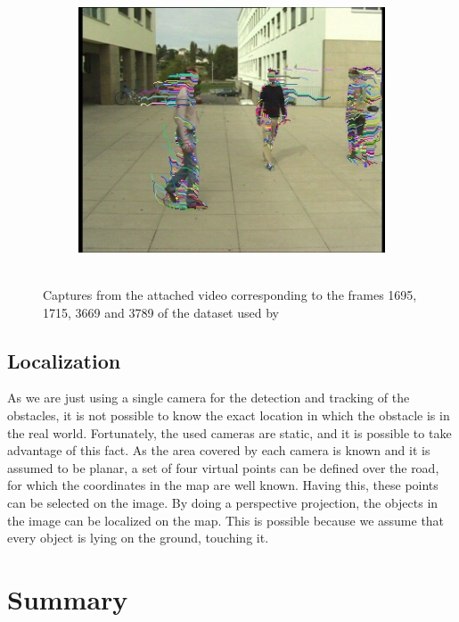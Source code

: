 \begin{figure}[t]
        ~
        \begin{subfigure}[b]{0.24\textwidth}
                \centering
                \includegraphics[width=\textwidth, trim=6 0 5 1, clip]{fig8.jpg}
                \caption{~}
                \label{fig:cp02_videoCapture4}
        \end{subfigure}%
        \caption{Captures from the attached video corresponding to the frames 1695, 1715, 3669 and 3789 of the dataset used by \cite{berclaz2011multiple}}\label{fig:cp02_videoCaptures}
\end{figure}

\subsection{Localization}\label{ch:chapter02_01_03}

As we are just using a single camera for the detection and tracking of the obstacles, it is not possible to know the exact location in which the obstacle is in the real world. Fortunately, the used cameras are static, and it is possible to take advantage of this fact. As the area covered by each camera is known and it is assumed to be planar, a set of four virtual points can be defined over the road, for which the coordinates in the map are well known.
Having this, these points can be selected on the image. By doing a perspective projection, the objects in the image can be localized on the map. This is possible because we assume that every object is lying on the ground, touching it.

\section{Summary}\label{ch:chapter02_03}

